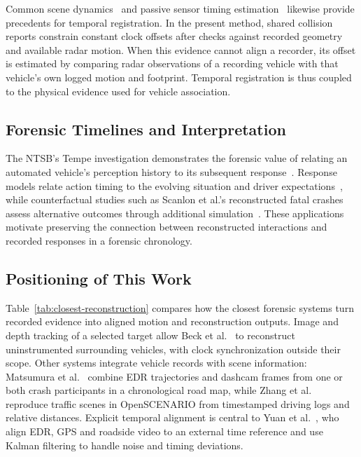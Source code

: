 Common scene dynamics~\cite{caspi2002alignment} and passive sensor timing
estimation~\cite{olson2010synchronization} likewise provide precedents for
temporal registration. In the present method, shared collision reports
constrain constant clock offsets after checks against recorded geometry
and available radar motion. When this evidence cannot align a recorder,
its offset is estimated by comparing radar observations of a recording
vehicle with that vehicle's own logged motion and footprint. Temporal
registration is thus coupled to the physical evidence used for vehicle
association.

\subsection{Forensic Timelines and Interpretation}

The NTSB's Tempe investigation demonstrates the forensic value of relating
an automated vehicle's perception history to its subsequent
response~\cite{ntsb2019tempe}. Response models relate action timing to
the evolving situation and driver expectations~\cite{engstrom2024response},
while counterfactual studies such as Scanlon et al.'s reconstructed fatal
crashes assess alternative outcomes through additional
simulation~\cite{scanlon2021fatal}.
These applications motivate preserving the connection between
reconstructed interactions and recorded responses in a forensic chronology.

\subsection{Positioning of This Work}
\label{subsec:positioning}

Table~\ref{tab:closest-reconstruction} compares how the closest forensic
systems turn recorded evidence into aligned motion and reconstruction
outputs. Image and depth tracking of a selected target allow Beck
et al.~\cite{beck2023pipeline} to reconstruct uninstrumented surrounding
vehicles, with clock synchronization outside their scope. Other systems
integrate vehicle records with scene information:
Matsumura et al.~\cite{matsumura2024precrash} combine EDR trajectories and
dashcam frames from one or both crash participants in a chronological
road map, while Zhang et al.~\cite{zhang2025reverse} reproduce traffic
scenes in OpenSCENARIO from timestamped driving logs and relative
distances. Explicit temporal alignment is central to Yuan
et al.~\cite{yuan2026multisource}, who align EDR, GPS and roadside video
to an external time reference and use Kalman filtering to handle noise
and timing deviations.

